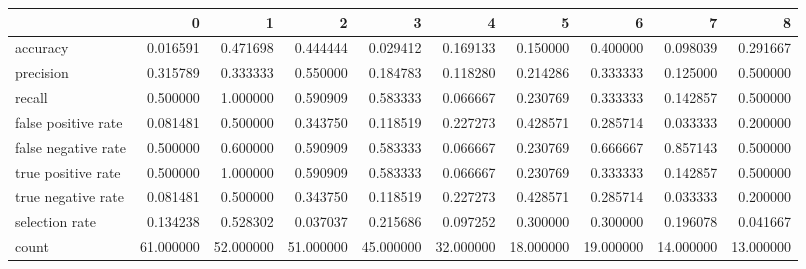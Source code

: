 \begin{tabular}{lrrrrrrrrr}
\toprule
{} &          0 &          1 &          2 &          3 &          4 &          5 &          6 &          7 &          8 \\
\midrule
accuracy            &   0.016591 &   0.471698 &   0.444444 &   0.029412 &   0.169133 &   0.150000 &   0.400000 &   0.098039 &   0.291667 \\
precision           &   0.315789 &   0.333333 &   0.550000 &   0.184783 &   0.118280 &   0.214286 &   0.333333 &   0.125000 &   0.500000 \\
recall              &   0.500000 &   1.000000 &   0.590909 &   0.583333 &   0.066667 &   0.230769 &   0.333333 &   0.142857 &   0.500000 \\
false positive rate &   0.081481 &   0.500000 &   0.343750 &   0.118519 &   0.227273 &   0.428571 &   0.285714 &   0.033333 &   0.200000 \\
false negative rate &   0.500000 &   0.600000 &   0.590909 &   0.583333 &   0.066667 &   0.230769 &   0.666667 &   0.857143 &   0.500000 \\
true positive rate  &   0.500000 &   1.000000 &   0.590909 &   0.583333 &   0.066667 &   0.230769 &   0.333333 &   0.142857 &   0.500000 \\
true negative rate  &   0.081481 &   0.500000 &   0.343750 &   0.118519 &   0.227273 &   0.428571 &   0.285714 &   0.033333 &   0.200000 \\
selection rate      &   0.134238 &   0.528302 &   0.037037 &   0.215686 &   0.097252 &   0.300000 &   0.300000 &   0.196078 &   0.041667 \\
count               &  61.000000 &  52.000000 &  51.000000 &  45.000000 &  32.000000 &  18.000000 &  19.000000 &  14.000000 &  13.000000 \\
\bottomrule
\end{tabular}
